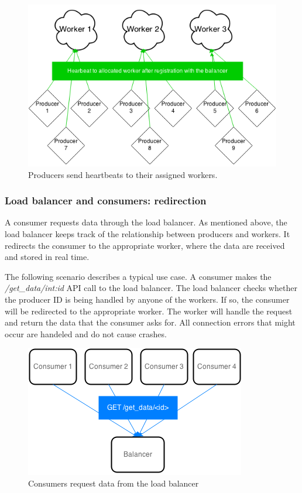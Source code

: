 \documentclass{sigchi}
\begin{document}
\begin{figure}[!h]
\centering
\includegraphics[width=0.9\columnwidth]{img/heartbeat}
\caption{Producers send heartbeats to their assigned workers.}
\label{fig:heartbeat}
\end{figure}

\subsubsection{Load balancer and consumers: redirection}

A consumer requests data through the load balancer. As mentioned above, the load balancer keeps track of the relationship between producers and workers. It redirects the consumer to the appropriate worker, where the data are received and stored in real time.

The following scenario describes a typical use case. A consumer makes the {\it /get\_data/int:id} API call to the load balancer. The load balancer checks whether the producer ID is being handled by anyone of the workers. If so, the consumer will be redirected to the appropriate worker. The worker will handle the request and return the data that the consumer asks for. All connection errors that might occur are handeled and do not cause crashes.

\begin{figure}[!h]
\centering
\includegraphics[width=0.9\columnwidth]{img/consumer_req}
\caption{Consumers request data from the load balancer}
\label{fig:consumer_req}
\end{figure}
\end{document}
